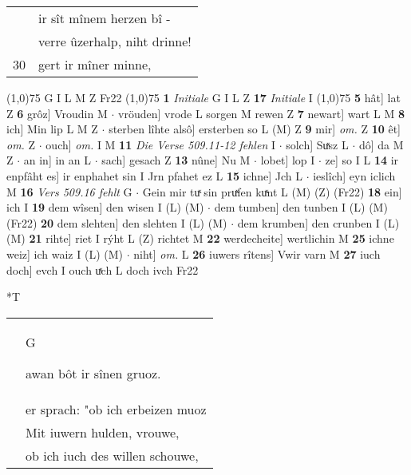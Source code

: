 \documentclass[8pt,a4paper,notitlepage]{article}
\begin{document}
\begin{table}[ht]
\begin{minipage}[t]{0.5\linewidth}
\begin{tabular}{rl}
 & ir sît mînem herzen bî -\\ 
 & verre ûzerhalp, niht drinne!\\ 
30 & gert ir mîner minne,\\ 
\end{tabular}
\scriptsize
\line(1,0){75} \newline
G I L M Z Fr22 \newline
\line(1,0){75} \newline
\textbf{1} \textit{Initiale} G I L Z  \textbf{17} \textit{Initiale} I  \newline
\line(1,0){75} \newline
\textbf{5} hât] lat Z \textbf{6} grôz] Vroudin M  $\cdot$ vröuden] vrode L sorgen M rewen Z \textbf{7} newart] wart L M \textbf{8} ich] Min lip L M Z  $\cdot$ sterben lîhte alsô] ersterben so L (M) Z \textbf{9} mir] \textit{om.} Z \textbf{10} êt] \textit{om.} Z  $\cdot$ ouch] \textit{om.} I M \textbf{11} \textit{Die Verse 509.11-12 fehlen} I   $\cdot$ solch] Suͯsz L  $\cdot$ dô] da M Z  $\cdot$ an in] in an L  $\cdot$ sach] gesach Z \textbf{13} nûne] Nu M  $\cdot$ lobet] lop I  $\cdot$ ze] so I L \textbf{14} ir enpfâht es] ir enphahet sin I Jrn pfahet ez L \textbf{15} ichne] Jch L  $\cdot$ ieslîch] eyn iclich M \textbf{16} \textit{Vers 509.16 fehlt} G   $\cdot$ Gein mir tuͯ sin pruͯfen kuͯnt L (M) (Z) (Fr22) \textbf{18} ein] ich I \textbf{19} dem wîsen] den wisen I (L) (M)  $\cdot$ dem tumben] den tunben I (L) (M) (Fr22) \textbf{20} dem slehten] den slehten I (L) (M)  $\cdot$ dem krumben] den crunben I (L) (M) \textbf{21} rihte] riet I rýht L (Z) richtet M \textbf{22} werdecheite] wertlichin M \textbf{25} ichne weiz] ich waiz I (L) (M)  $\cdot$ niht] \textit{om.} L \textbf{26} iuwers rîtens] Vwir varn M \textbf{27} iuch doch] evch I ouch uͯch L doch ivch Fr22 \newline
\end{minipage}
\hspace{0.5cm}
\begin{minipage}[t]{0.5\linewidth}
\small
\begin{center}*T
\end{center}
\begin{tabular}{rl}
 & \begin{large}G\end{large}awan bôt ir sînen gruoz.\\ 
 & er sprach: "ob ich erbeizen muoz\\ 
 & Mit iuwern hulden, vrouwe,\\ 
 & ob ich iuch des willen schouwe,\\ 

\end{tabular}
\end{minipage}
\end{table}
\end{document}
